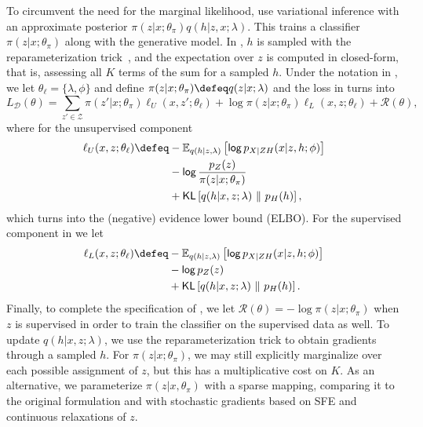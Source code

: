 To circumvent the need for the marginal likelihood,
\citet{KingmaEtAl2014SSVAE} use variational inference
\citep{Jordan+1999:VI} with an approximate posterior $\pi(z|x;
    \theta_\pi)q(h|z,x; \lambda)$. This trains a classifier $\pi(z|x;
    \theta_\pi)$ along with the generative model.
In \citet{KingmaEtAl2014SSVAE}, $h$ is sampled with the
reparameterization trick~\citep{Kingma+2014:VAE,RezendeEtAl14VAE},
and the expectation over $z$ is computed in closed-form, that is,
assessing all $K$ terms of the sum for a sampled $h$. Under the
notation in , we let $\theta_\ell = \{\lambda,
    \phi\}$ and define $\pi(z|x; \theta_\pi) \defeq q(z|x; \lambda)$ and
the loss in 
turns into
%
\begin{equation}
    L_{\mathcal D}(\theta) =
    \sum_{z'\in\mathcal Z}\pi(z'|x; \theta_\pi)\ell_U(x, z'; \theta_\ell)
    + \log \pi(z|x; \theta_\pi)\ell_L(x, z; \theta_\ell)
    + \mathcal{R}(\theta),
    \label{eq:ss_loss_vae_vi}
\end{equation}
%
where for the unsupervised component
%
\begin{align}
    \begin{split}
        \ell_U(x, z; \theta_\ell) \defeq
        & - \mathbb E_{q(h|z,  \lambda)}\left[ \log p_{X|ZH}(x |z, h; \phi) \right] \\
        & - \log \frac{p_Z(z)}{\pi(z |x; \theta_\pi)}                          \\
        & + \KL\left[q(h |x, z; \lambda) \,\,\|\,\, p_H(h)\right],
        \label{eq:elbonotation}
    \end{split}
\end{align}
%
which turns  into the (negative) evidence lower bound
(ELBO). For the supervised component in  we let
%
\begin{align}
    \begin{split}
        \ell_L(x, z; \theta_\ell) \defeq
        & - \mathbb E_{q(h|z,  \lambda)}\left[ \log p_{X|ZH}(x |z, h; \phi) \right] \\
        & - \log p_Z(z)                          \\
        & + \KL\left[q(h |x, z; \lambda) \,\,\|\,\, p_H(h)\right].
        \label{eq:elbosupervised}
    \end{split}
\end{align}
%
Finally, to complete the specification of ,
we let $\mathcal R(\theta) = - \log \pi(z |x; \theta_\pi)$ when $z$ is supervised
in order to train the classifier on the supervised data as well.
To update $q(h | x, z; \lambda)$, we use the
reparameterization trick to obtain gradients through a sampled $h$.
For $\pi(z | x; \theta_\pi)$, we may still explicitly marginalize over
each possible assignment of $z$, but this has a multiplicative cost
on $K$. As an alternative, we parameterize $\pi(z|x,
    \theta_\pi)$ with a sparse mapping, comparing it to the original
formulation and with stochastic gradients based on SFE and continuous
relaxations of $z$.

